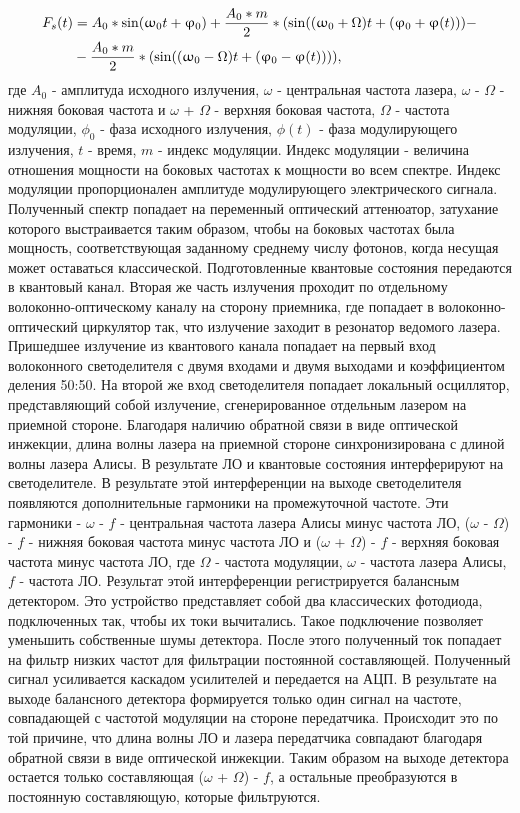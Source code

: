\begin{align}
\label{eq:spectrum seed ref}
F_s(t) & = A_0 * \sin(\omega_0 t + \phi_0) + \frac{A_0 * m}{2} * (\sin((\omega_0 + \Omega)t + (\phi_0 + \phi (t))) - \notag \\
&- \frac{A_0 * m}{2} * (\sin((\omega_0 - \Omega)t + (\phi_0 - \phi (t)))),
\end{align}где $A_0$ - амплитуда исходного излучения,  $\omega$ - центральная частота лазера, $\omega$ - $\Omega$ - нижняя боковая частота  и $\omega$ + $\Omega$ - верхняя боковая частота, $\Omega$ - частота модуляции, $\phi_0$ - фаза исходного излучения, $\phi(t)$ - фаза модулирующего излучения, $t$ - время, $m$ - индекс модуляции. Индекс модуляции - величина отношения мощности на боковых частотах к мощности во всем спектре. Индекс модуляции пропорционален амплитуде модулирующего электрического сигнала.  Полученный спектр попадает на переменный оптический аттенюатор, затухание которого выстраивается таким образом, чтобы на боковых частотах была мощность, соответствующая заданному среднему числу фотонов, когда несущая может оставаться классической. Подготовленные квантовые состояния передаются в квантовый канал. 
Вторая же часть излучения проходит по отдельному волоконно-оптическому каналу на сторону приемника, где попадает в волоконно-оптический циркулятор так, что излучение заходит в резонатор ведомого лазера. 
Пришедшее излучение из квантового канала попадает на первый вход волоконного светоделителя с двумя входами и двумя выходами и коэффициентом деления 50:50. На второй же вход светоделителя попадает локальный осциллятор, представляющий собой излучение, сгенерированное отдельным лазером на приемной стороне. Благодаря наличию обратной связи в виде оптической инжекции, длина волны лазера на приемной стороне синхронизирована с длиной волны лазера Алисы. В результате ЛО и квантовые состояния интерферируют на светоделителе. В результате этой интерференции на выходе светоделителя появляются дополнительные гармоники на промежуточной частоте. Эти гармоники -  $\omega$ - $f$ - центральная частота лазера Алисы минус частота ЛО, ($\omega$ - $\Omega$) - $f$  - нижняя боковая частота минус частота ЛО   и ($\omega$ + $\Omega$) - $f$ - верхняя боковая частота минус частота ЛО, где $\Omega$ - частота модуляции, $\omega$ - частота лазера Алисы, $f$ - частота ЛО. 
\newline Результат этой интерференции регистрируется балансным детектором. Это устройство представляет собой два классических фотодиода, подключенных так, чтобы их токи вычитались. Такое подключение позволяет уменьшить собственные шумы детектора. После этого полученный ток попадает на фильтр низких частот для фильтрации постоянной составляющей. Полученный сигнал усиливается каскадом усилителей и передается на АЦП.  В результате на выходе балансного детектора формируется только один сигнал на частоте, совпадающей с частотой модуляции на стороне передатчика. Происходит это по той причине, что длина волны ЛО и лазера передатчика совпадают благодаря обратной связи в виде оптической инжекции. Таким образом на выходе детектора остается только составляющая ($\omega$ + $\Omega$) - $f$, а остальные преобразуются в постоянную составляющую, которые фильтруются. 
